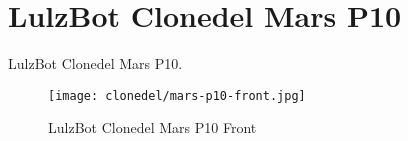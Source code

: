 %
%
%
%
%

\section{LulzBot Clonedel Mars P10}
LulzBot Clonedel Mars P10.

\begin{figure}[h!]
\texttt{[image: clonedel/mars-p10-front.jpg]}
 \caption{LulzBot Clonedel Mars P10 Front}
 \label{fig:clonedel-mars-p10-front}
\end{figure}


